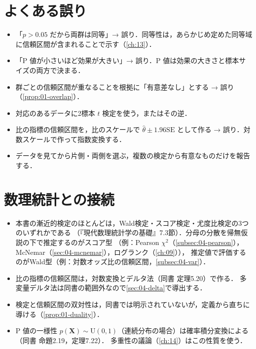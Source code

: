 \documentclass[a4paper,11pt,openany]{ltjsbook}
\newcommand{\SE}{\mathrm{SE}}
\newcommand{\Unif}{\mathrm{U}}
\begin{document}
\section{よくある誤り}\label{sec:01-err}
\begin{warnbox}
\begin{itemize}
\item 「$p>0.05$ だから両群は同等」→ 誤り．同等性は，あらかじめ定めた同等域に信頼区間が含まれることで示す（\cref{ch:13}）．
\item 「P 値が小さいほど効果が大きい」→ 誤り．P 値は効果の大きさと標本サイズの両方で決まる．
\item 群ごとの信頼区間が重なることを根拠に「有意差なし」とする → 誤り（\cref{prop:01-overlap}）．
\item 対応のあるデータに2標本 $t$ 検定を使う，またはその逆．
\item 比の指標の信頼区間を，比のスケールで $\hat\theta\pm1.96\SE$ として作る → 誤り．対数スケールで作って指数変換する．
\item データを見てから片側・両側を選ぶ，複数の検定から有意なものだけを報告する．
\end{itemize}
\end{warnbox}

\section{数理統計との接続}\label{sec:01-link}
\begin{linkbox}
\begin{itemize}
\item 本書の漸近的検定のほとんどは，Wald検定・スコア検定・尤度比検定の3つのいずれかである
      （『現代数理統計学の基礎』7.3節）．分母の分散を帰無仮説の下で推定するのがスコア型
      （例：Pearson $\chi^2$（\cref{subsec:04-pearson}），McNemar（\cref{sec:04-mcnemar}），ログランク（\cref{ch:09}）），
      推定値で評価するのがWald型（例：対数オッズ比の信頼区間，\cref{subsec:04-var}）．
\item 比の指標の信頼区間は，対数変換とデルタ法（同書 定理5.20）で作る．
      多変量デルタ法は同書の範囲外なので\cref{sec:04-delta}で導出する．
\item 検定と信頼区間の双対性は，同書では明示されていないが，定義から直ちに導ける（\cref{prop:01-duality}）．
\item P 値の一様性 $p(\bm X)\sim\Unif(0,1)$（連続分布の場合）は確率積分変換による（同書 命題2.19，定理7.22）．
      多重性の議論（\cref{ch:14}）はこの性質を使う．
\end{itemize}
\end{linkbox}
\end{document}
